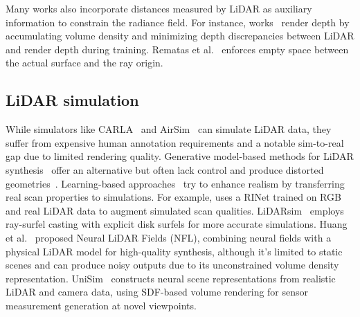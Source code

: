 Many works also incorporate distances measured by LiDAR as auxiliary information to constrain the radiance field. For instance, works~\cite{chang2023neural, wang2023neural} render depth by accumulating volume density and minimizing depth discrepancies between LiDAR and render depth during training. Rematas et al.~\cite{rematas2022urban} enforces empty space between the actual surface and the ray origin.





\subsection{LiDAR simulation} 
While simulators like CARLA~\cite{dosovitskiy2017carla} and AirSim~\cite{shah2018airsim} can simulate LiDAR data, they suffer from expensive human annotation requirements and a notable sim-to-real gap due to limited rendering quality. Generative model-based methods for LiDAR synthesis~\cite{caccia2019deep,zyrianov2022learning} offer an alternative but often lack control and produce distorted geometries~\cite{li2023pcgen}.
Learning-based approaches~\cite{li2023pcgen,fang2020augmented,manivasagam2020lidarsim} try to enhance realism by transferring real scan properties to simulations. For example, \cite{guillard2022learning} uses a RINet trained on RGB and real LiDAR data to augment simulated scan qualities. LiDARsim~\cite{manivasagam2020lidarsim} employs ray-surfel casting with explicit disk surfels for more accurate simulations.
Huang et al.~\cite{Huang2023nfl} proposed Neural LiDAR Fields (NFL), combining neural fields with a physical LiDAR model for high-quality synthesis, although it's limited to static scenes and can produce noisy outputs due to its unconstrained volume density representation.
UniSim~\cite{yang2023unisim} constructs neural scene representations from realistic LiDAR and camera data, using SDF-based volume rendering for sensor measurement generation at novel viewpoints.

